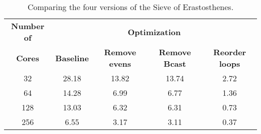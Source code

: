 \begin{table}[ht]
\centering
\begin{tabular}{ccccc}
  \toprule
  \textbf{Number of} & \multicolumn{4}{c}{\textbf{Optimization}} \\
 \textbf{Cores} & \textbf{Baseline} & \textbf{Remove evens} & \textbf{Remove Bcast} & \textbf{Reorder loops} \\
 \midrule
 32 & 28.18 & 13.82 & 13.74 & 2.72 \\ 
   64 & 14.28 & 6.99 & 6.77 & 1.36 \\ 
  128 & 13.03 & 6.32 & 6.31 & 0.73 \\ 
  256 & 6.55 & 3.17 & 3.11 & 0.37 \\ 
   \bottomrule
\end{tabular}
\caption{Comparing the four versions of the Sieve of Erastosthenes.} 
\label{tab:table2}
\end{table}

